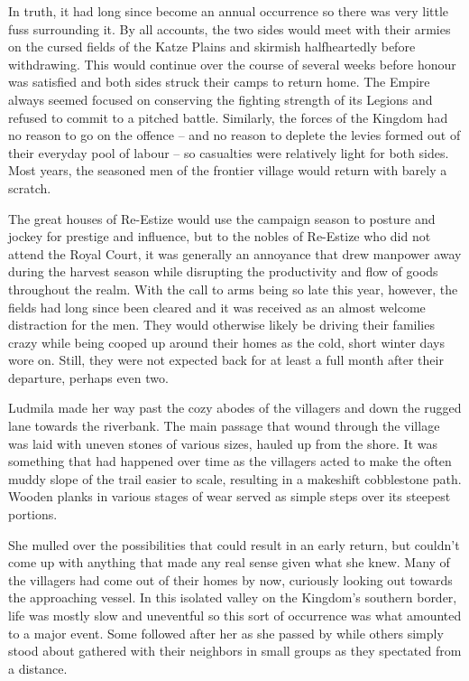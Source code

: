 In truth, it had long since become an annual occurrence so there was very little fuss surrounding it. By all accounts, the two sides would meet with their armies on the cursed fields of the Katze Plains and skirmish halfheartedly before withdrawing. This would continue over the course of several weeks before honour was satisfied and both sides struck their camps to return home. The Empire always seemed focused on conserving the fighting strength of its Legions and refused to commit to a pitched battle. Similarly, the forces of the Kingdom had no reason to go on the offence – and no reason to deplete the levies formed out of their everyday pool of labour – so casualties were relatively light for both sides. Most years, the seasoned men of the frontier village would return with barely a scratch.

 

The great houses of Re-Estize would use the campaign season to posture and jockey for prestige and influence, but to the nobles of Re-Estize who did not attend the Royal Court, it was generally an annoyance that drew manpower away during the harvest season while disrupting the productivity and flow of goods throughout the realm. With the call to arms being so late this year, however, the fields had long since been cleared and it was received as an almost welcome distraction for the men. They would otherwise likely be driving their families crazy while being cooped up around their homes as the cold, short winter days wore on. Still, they were not expected back for at least a full month after their departure, perhaps even two.

 

Ludmila made her way past the cozy abodes of the villagers and down the rugged lane towards the riverbank. The main passage that wound through the village was laid with uneven stones of various sizes, hauled up from the shore. It was something that had happened over time as the villagers acted to make the often muddy slope of the trail easier to scale, resulting in a makeshift cobblestone path. Wooden planks in various stages of wear served as simple steps over its steepest portions.

 

She mulled over the possibilities that could result in an early return, but couldn’t come up with anything that made any real sense given what she knew. Many of the villagers had come out of their homes by now, curiously looking out towards the approaching vessel. In this isolated valley on the Kingdom’s southern border, life was mostly slow and uneventful so this sort of occurrence was what amounted to a major event. Some followed after her as she passed by while others simply stood about gathered with their neighbors in small groups as they spectated from a distance.


